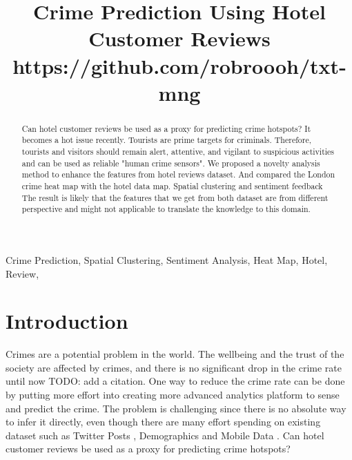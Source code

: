 \documentclass[conference]{IEEEtran}
\begin{document}
\title{Crime Prediction Using Hotel Customer Reviews\\
{\footnotesize https://github.com/robroooh/txt-mng}
}

\author{
\and
{}
}

\maketitle

\begin{abstract}
Can hotel customer reviews be used as a proxy for predicting crime hotspots? It becomes a hot issue recently. Tourists are prime targets for criminals. Therefore, tourists and visitors should remain alert, attentive, and vigilant to suspicious activities and can be used as reliable "human crime sensors". We proposed a novelty analysis method to enhance the features from hotel reviews dataset. And compared the London crime heat map with the hotel data map. Spatial clustering and sentiment feedback The result is likely that the features that we get from both dataset are from different perspective and might not applicable to translate the knowledge to this domain.
\end{abstract}

\begin{IEEEkeywords}
Crime Prediction, Spatial Clustering, Sentiment Analysis, Heat Map, Hotel, Review,
\end{IEEEkeywords}

\section{Introduction}
Crimes are a potential problem in the world. The wellbeing and the trust of the society are affected by crimes, and there is no significant drop in the crime rate until now TODO: add a citation. One way to reduce the crime rate can be done by putting more effort into creating more advanced analytics platform to sense and predict the crime. The problem is challenging since there is no absolute way to infer it directly, even though there are many effort spending on existing dataset such as Twitter Posts \cite{autocrimepred}, Demographics and Mobile Data \cite{towardscrimepred}. Can hotel customer reviews be used as a proxy for predicting crime hotspots?
\end{document}

